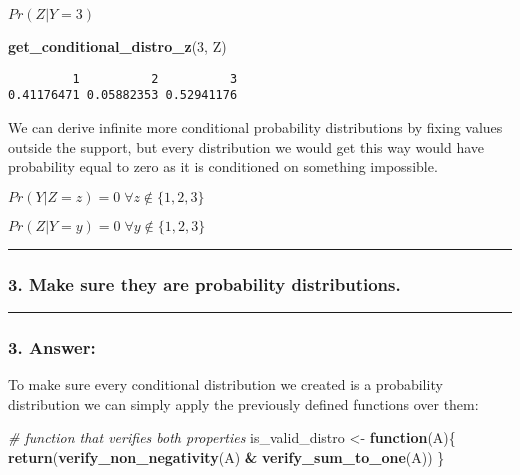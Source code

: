 \documentclass[
]{article}
\newenvironment{Shaded}{\begin{snugshade}}{\end{snugshade}}
\newcommand{\CommentTok}[1]{\textcolor[rgb]{0.56,0.35,0.01}{\textit{#1}}}
\newcommand{\ControlFlowTok}[1]{\textcolor[rgb]{0.13,0.29,0.53}{\textbf{#1}}}
\newcommand{\DecValTok}[1]{\textcolor[rgb]{0.00,0.00,0.81}{#1}}
\newcommand{\FunctionTok}[1]{\textcolor[rgb]{0.13,0.29,0.53}{\textbf{#1}}}
\newcommand{\NormalTok}[1]{#1}
\newcommand{\OtherTok}[1]{\textcolor[rgb]{0.56,0.35,0.01}{#1}}
\newcommand{\SpecialCharTok}[1]{\textcolor[rgb]{0.81,0.36,0.00}{\textbf{#1}}}
\begin{document}
\(Pr(Z | Y=3)\)

\begin{Shaded}
\begin{Highlighting}[]
\FunctionTok{get\_conditional\_distro\_z}\NormalTok{(}\DecValTok{3}\NormalTok{, Z)}
\end{Highlighting}
\end{Shaded}

\begin{verbatim}
         1          2          3 
0.41176471 0.05882353 0.52941176 
\end{verbatim}

We can derive infinite more conditional probability distributions by
fixing values outside the support, but every distribution we would get
this way would have probability equal to zero as it is conditioned on
something impossible.

\(Pr(Y | Z = z) = 0 \; \forall z \notin \{1,2,3\}\)

\(Pr(Z | Y = y) = 0 \; \forall y \notin \{1,2,3\}\)

\begin{center}\rule{0.5\linewidth}{0.5pt}\end{center}

\bigskip

\hypertarget{make-sure-they-are-probability-distributions.}{%
\subsubsection{3. Make sure they are probability
distributions.}\label{make-sure-they-are-probability-distributions.}}

\begin{center}\rule{0.5\linewidth}{0.5pt}\end{center}

\hypertarget{answer-2}{%
\subsubsection{3. Answer:}\label{answer-2}}

To make sure every conditional distribution we created is a probability
distribution we can simply apply the previously defined functions over
them:

\begin{Shaded}
\begin{Highlighting}[]
\CommentTok{\# function that verifies both properties}
\NormalTok{is\_valid\_distro }\OtherTok{\textless{}{-}} \ControlFlowTok{function}\NormalTok{(A)\{}
  \FunctionTok{return}\NormalTok{(}\FunctionTok{verify\_non\_negativity}\NormalTok{(A) }\SpecialCharTok{\&} \FunctionTok{verify\_sum\_to\_one}\NormalTok{(A))}
\NormalTok{\}}
\end{Highlighting}
\end{Shaded}
\end{document}
